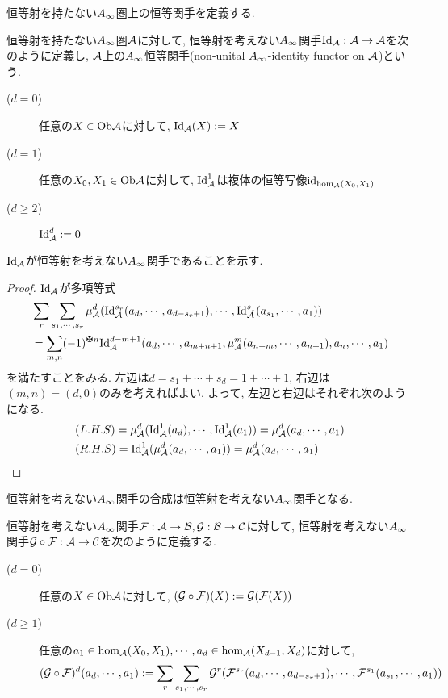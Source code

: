 \documentclass[uplatex, a4paper, 14Q, dvipdfmx]{jsarticle}
\begin{document}
恒等射を持たない$A_{\infty}$圏上の恒等関手を定義する. 

\begin{definition} \label{def_identity__Ainf_func}
  恒等射を持たない$A_{\infty}$圏$\mathcal{A}$に対して, 恒等射を考えない$A_{\infty}$関手$\mathrm{Id}_{\mathcal{A}} : \mathcal{A} \to \mathcal{A}$を次のように定義し, $\mathcal{A}$上の$A_{\infty}$恒等関手(non-unital $A_{\infty}$-identity functor on $\mathcal{A}$)という.
  \begin{description}
    \item[($d=0$)] 任意の$X \in \mathrm{Ob}\mathcal{A}$に対して, $\mathrm{Id}_{\mathcal{A}}(X) := X$
    \item[($d=1$)] 任意の$X_0,X_1 \in \mathrm{Ob}\mathcal{A}$に対して, $\mathrm{Id}_{\mathcal{A}}^1$は複体の恒等写像$\mathrm{id}_{\hom_{\mathcal{A}}(X_0,X_1)}$
    \item[($d \geq 2$)] $\mathrm{Id}_{\mathcal{A}}^d := 0$
  \end{description}
\end{definition}

$\mathrm{Id}_{\mathcal{A}}$が恒等射を考えない$A_{\infty}$関手であることを示す. 

\begin{proof}
  $\mathrm{Id}_{\mathcal{A}}$が多項等式
  \begin{align*}
    &\sum_r \sum_{s_1,\cdots,s_r} \mu^d_\A (\Id_\A^{s_r} (a_d,\cdots,a_{d-s_r+1}), \cdots, \Id_\A^{s_1}(a_{s_1},\cdots,a_1)) \\ 
    &= \sum_{m,n} (-1)^{\maltese n} \Id_\A^{d-m+1} (a_d,\cdots,a_{m+n+1}, \mu^m_\A(a_{n+m},\cdots,a_{n+1}), a_n,\cdots,a_1)
  \end{align*}
  を満たすことをみる.
  左辺は$d = s_1+\cdots+s_d = 1+\cdots+1$, 右辺は$(m,n)=(d,0)$のみを考えればよい. 
  よって, 左辺と右辺はそれぞれ次のようになる. 
  \begin{align*}
    &(L.H.S) 
    = \mu^d_{\mathcal{A}}(\mathrm{Id}_{\mathcal{A}}^1(a_d), \cdots, \mathrm{Id}_{\mathcal{A}}^1(a_1)) 
    = \mu^d_{\mathcal{A}}(a_d, \cdots, a_1) \\
    &(R.H.S)
    = \mathrm{Id}_{\mathcal{A}}^1(\mu^d_{\mathcal{A}}(a_d, \cdots, a_1)) 
    = \mu^d_{\mathcal{A}}(a_d, \cdots, a_1)
  \end{align*}
\end{proof}

恒等射を考えない$A_{\infty}$関手の合成は恒等射を考えない$A_{\infty}$関手となる. 

\begin{definition} \label{def_comp_of_Ainf_func}
  恒等射を考えない$A_{\infty}$関手$\mathcal{F} : \mathcal{A} \to \mathcal{B}, \mathcal{G} : \mathcal{B} \to \mathcal{C}$に対して, 恒等射を考えない$A_{\infty}$関手$\mathcal{G} \circ \mathcal{F} : \mathcal{A} \to \mathcal{C}$を次のように定義する. 
  \begin{description}
    \item[($d=0$)] 任意の$X \in \mathrm{Ob}\mathcal{A}$に対して, $(\mathcal{G} \circ \mathcal{F})(X) : = \mathcal{G}(\mathcal{F}(X))$
    \item[($d \geq 1$)] 任意の$a_1 \in \hom_{\mathcal{A}}(X_0,X_1), \cdots, a_d \in \hom_{\mathcal{A}}(X_{d-1},X_d)$に対して,
    \begin{align*}
      (\mathcal{G} \circ \mathcal{F})^d (a_d,\cdots,a_1)
      := \sum_r \sum_{s_1,\cdots,s_r} \mathcal{G}^r(\mathcal{F}^{s_r} (a_d,\cdots,a_{d-s_r+1}), \cdots, \mathcal{F}^{s_1}(a_{s_1},\cdots,a_1))
    \end{align*}
  \end{description}
\end{definition}
\end{document}
